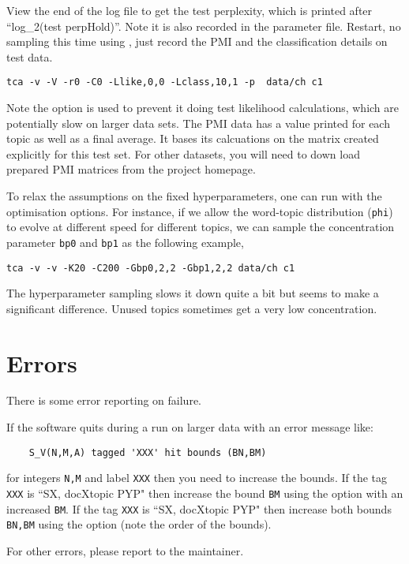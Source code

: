 \documentclass[a4paper,english]{article}
\begin{document}
View the end of the log file to get the test perplexity,
which is printed after ``log\_2(test perpHold)''.
Note it is also recorded in the parameter file.
Restart, no sampling this time using , just record the 
PMI and the classification details on test data.
\begin{verbatim}
tca -v -V -r0 -C0 -Llike,0,0 -Lclass,10,1 -p  data/ch c1
\end{verbatim}

Note the  option is used to prevent it 
doing test likelihood calculations, which are potentially slow
on larger data sets.
The PMI data has a value printed for each topic as well as a 
final average.  It bases its calcuations on the matrix
 created explicitly for this test set.
For other datasets, you will need to down load prepared
PMI matrices from the project homepage.

To relax the assumptions on the fixed hyperparameters, one can run with 
the optimisation options. For instance, if we allow the word-topic distribution (\texttt{phi}) to 
evolve at different speed for different topics, we can sample the concentration parameter \texttt{bp0} and \texttt{bp1} as the following example,
\begin{verbatim}
tca -v -v -K20 -C200 -Gbp0,2,2 -Gbp1,2,2 data/ch c1
\end{verbatim}
The hyperparameter sampling slows it down quite a bit but seems to
make a significant difference.  Unused topics sometimes
get a very low concentration.

\section{Errors}

There is some error reporting on failure.

If the software quits during a run on larger data with an
error message like:
\begin{verbatim}
    S_V(N,M,A) tagged 'XXX' hit bounds (BN,BM)
\end{verbatim}
for integers \texttt{N,M} and label \texttt{XXX} then you
need to increase the bounds.
If the tag \texttt{XXX} is ``SX, docXtopic PYP"
then increase the bound \texttt{BM} using the option
 with an increased \texttt{BM}.
If the tag \texttt{XXX} is ``SX, docXtopic PYP"
then increase both bounds \texttt{BN,BM} using the option
(note the order of the bounds).

For other errors, please report to the
maintainer.
\end{document}
